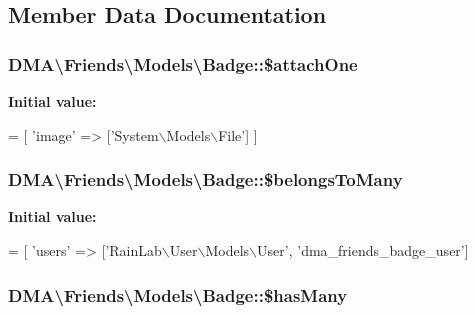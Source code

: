\subsection{Member Data Documentation}
\hypertarget{classDMA_1_1Friends_1_1Models_1_1Badge_abd4795b249f74dd23651f51479fbe5fb}{
\subsubsection[{\$attach\+One}]{\setlength{\rightskip}{0pt plus 5cm}D\+M\+A\textbackslash{}\+Friends\textbackslash{}\+Models\textbackslash{}\+Badge\+::\$attach\+One}}\label{classDMA_1_1Friends_1_1Models_1_1Badge_abd4795b249f74dd23651f51479fbe5fb}
{\bfseries Initial value\+:}
\begin{DoxyCode}
= [
        \textcolor{stringliteral}{'image'} => [\textcolor{stringliteral}{'System\(\backslash\)Models\(\backslash\)File'}]
    ]
\end{DoxyCode}
\hypertarget{classDMA_1_1Friends_1_1Models_1_1Badge_ab143958e8f63d5b612832fee145f0aa1}{
\subsubsection[{\$belongs\+To\+Many}]{\setlength{\rightskip}{0pt plus 5cm}D\+M\+A\textbackslash{}\+Friends\textbackslash{}\+Models\textbackslash{}\+Badge\+::\$belongs\+To\+Many}}\label{classDMA_1_1Friends_1_1Models_1_1Badge_ab143958e8f63d5b612832fee145f0aa1}
{\bfseries Initial value\+:}
\begin{DoxyCode}
= [
        \textcolor{stringliteral}{'users'} => [\textcolor{stringliteral}{'RainLab\(\backslash\)User\(\backslash\)Models\(\backslash\)User'}, \textcolor{stringliteral}{'dma\_friends\_badge\_user'}]
\end{DoxyCode}
\hypertarget{classDMA_1_1Friends_1_1Models_1_1Badge_a1b363de2d8c44cd12dff6bca90a6b212}{
\subsubsection[{\$has\+Many}]{\setlength{\rightskip}{0pt plus 5cm}D\+M\+A\textbackslash{}\+Friends\textbackslash{}\+Models\textbackslash{}\+Badge\+::\$has\+Many}}\label{classDMA_1_1Friends_1_1Models_1_1Badge_a1b363de2d8c44cd12dff6bca90a6b212}
